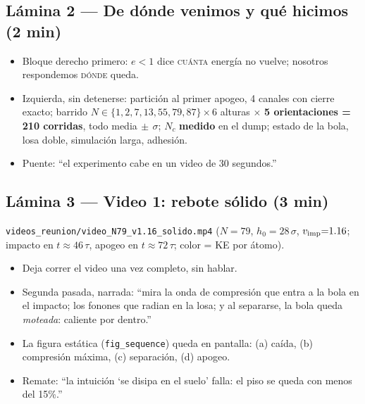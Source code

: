\documentclass[11pt]{article}
\newcommand{\clave}[1]{\textcolor{red!60!black}{\textbf{#1}}}
\begin{document}
\subsection*{Lámina 2 --- De dónde venimos y qué hicimos (2 min)}
\begin{itemize}[leftmargin=1.4em]
    \item Bloque derecho primero: $e<1$ dice \textsc{cuánta} energía no
    vuelve; nosotros respondemos \textsc{dónde} queda.
    \item Izquierda, sin detenerse: partición al primer apogeo, 4
    canales con cierre exacto; barrido
    $N\in\{1,2,7,13,55,79,87\}\times6$ alturas $\times$
    \clave{5 orientaciones = 210 corridas}, todo media$\,\pm\,\sigma$;
    $N_c$ \clave{medido} en el dump; estado de la bola, losa doble,
    simulación larga, adhesión.
    \item Puente: ``el experimento cabe en un video de 30 segundos.''
\end{itemize}

\subsection*{Lámina 3 --- Video 1: rebote sólido (3 min)}
\texttt{videos\_reunion/video\_N79\_v1.16\_solido.mp4} ($N{=}79$,
$h_0{=}28\,\sigma$, $v_{\rm imp}{=}1.16$; impacto en $t\approx46\,\tau$,
apogeo en $t\approx72\,\tau$; color = KE por átomo).
\begin{itemize}[leftmargin=1.4em]
    \item Deja correr el video una vez completo, sin hablar.
    \item Segunda pasada, narrada: ``mira la onda de compresión que entra
    a la bola en el impacto; los fonones que radian en la losa; y al
    separarse, la bola queda \emph{moteada}: caliente por dentro.''
    \item La figura estática (\texttt{fig\_sequence}) queda en pantalla:
    (a) caída, (b) compresión máxima, (c) separación, (d) apogeo.
    \item Remate: ``la intuición `se disipa en el suelo' falla: el piso
    se queda con menos del 15\%.''
\end{itemize}
\end{document}
